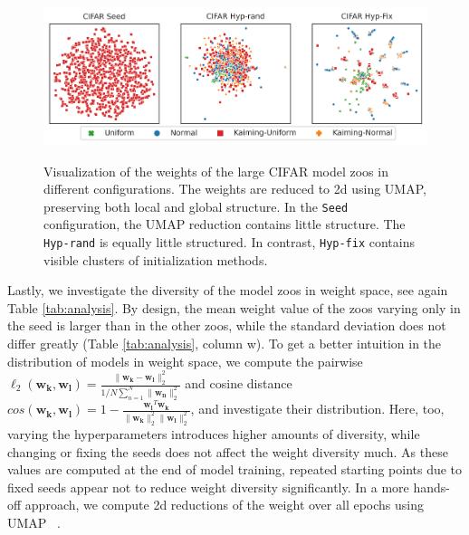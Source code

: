 \begin{figure}[]
\begin{minipage}[t]{1.0\textwidth}
\begin{center}
\includegraphics[trim=0in 0in 0in 0in, width=0.85\linewidth]{imgs/umap_visuals.png}
\vspace{-6pt}
\caption{
Visualization of the weights of the large CIFAR model zoos in different configurations. The weights are reduced to 2d using UMAP, preserving both local and global structure.
In the \texttt{Seed} configuration, the UMAP reduction contains little structure. The \texttt{Hyp-rand} is equally little structured.
In contrast, \texttt{Hyp-fix} contains visible clusters of initialization methods.
}
\vspace{-8pt}
\label{fig:umap_visualizations}    
\end{center}
\end{minipage}
\end{figure}
Lastly, we investigate the diversity of the model zoos in weight space, see again Table \ref{tab:analysis}. 
By design, the mean weight value of the zoos varying only in the seed is larger than in the other zoos, while the standard deviation does not differ greatly (Table \ref{tab:analysis}, column w). 
To get a better intuition in the distribution of models in weight space, we compute the pairwise $\ell_2(\mathbf{w_k},\mathbf{w_l})=\frac{\|\mathbf{w_k}-\mathbf{w_l}\|_2^2}{1/N \sum_{n=1}^N\| \mathbf{w_n} \|_2^2}$ and cosine distance $cos(\mathbf{w_k},\mathbf{w_l}) = 1 - \frac{\mathbf{w_l}^T \mathbf{w_k}}{\|\mathbf{w_k}\|_2^2 \| \mathbf{w_l} \|_2^2}$, and investigate their distribution. 
Here, too, varying the hyperparameters introduces higher amounts of diversity, while changing or fixing the seeds does not affect the weight diversity much. As these values are computed at the end of model training, repeated starting points due to fixed seeds appear not to reduce weight diversity significantly.
In a more hands-off approach, we compute 2d reductions of the weight over all epochs using UMAP ~\citep{mcinnesUMAPUniformManifold2018a}. 
